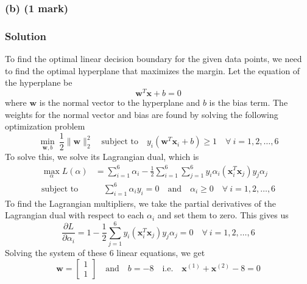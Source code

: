 \documentclass[12pt]{article}
\begin{document}
    \subsubsection*{(b) (1 mark)}
    \subsubsection*{Solution}
    To find the optimal linear decision boundary for the given data points, we need to find
    the optimal hyperplane that maximizes the margin. Let the equation of the hyperplane be
    \begin{equation}
        \label{eq:hyperplane}
        \mathbf{w}^T \mathbf{x} + b = 0
    \end{equation}
    where $\mathbf{w}$ is the normal vector to the hyperplane and $b$ is the bias term. The
    weights for the normal vector and bias are found by solving the following optimization problem
    \begin{equation}
        \label{eq:opt}
        \min_{\mathbf{w}, b} \ \frac{1}{2} \lVert \mathbf{w} \rVert_{2}^{2} \quad \text{subject to}
        \quad y_{i} (\mathbf{w}^T \mathbf{x}_{i} + b) \geq 1 \quad \forall \ i = 1, 2, \dots, 6
    \end{equation}
    To solve this, we solve its Lagrangian dual, which is
    \begin{align}
        \label{eq:dual}
        \max_{\alpha} L(\alpha) &= \sum_{i=1}^{6} \alpha_{i} - \frac{1}{2} \sum_{i=1}^{6} \sum_{j=1}^{6}
        y_{i} \alpha_{i} (\mathbf{x}_{i}^T \mathbf{x}_{j}) y_{j} \alpha_{j} \\
        \text{subject to} &\quad \sum_{i=1}^{6} \alpha_{i} y_{i} = 0 \quad \text{and} \quad \alpha_{i} \geq 0
        \quad \forall \ i = 1, 2, \dots, 6 \nonumber
    \end{align}
    To find the Lagrangian multipliers, we take the partial derivatives of the Lagrangian dual
    with respect to each $\alpha_{i}$ and set them to zero. This gives us
    \begin{equation}
        \label{eq:partial}
        \frac{\partial L}{\partial \alpha_{i}} = 1 - \frac{1}{2} \sum_{j=1}^{6} y_{i} (\mathbf{x}_{i}^T \mathbf{x}_{j}) y_{j} \alpha_{j} = 0
        \quad \forall \ i = 1, 2, \dots, 6
    \end{equation}
    Solving the system of these 6 linear equations, we get
    \begin{equation}
        \label{eq:optimal}
        \mathbf{w} = \begin{bmatrix} 1 \\ 1 \end{bmatrix} \quad \text{and} \quad b = -8 \quad
        \text{i.e.} \quad \mathbf{x}^{(1)} + \mathbf{x}^{(2)} - 8 = 0
    \end{equation}
\end{document}
